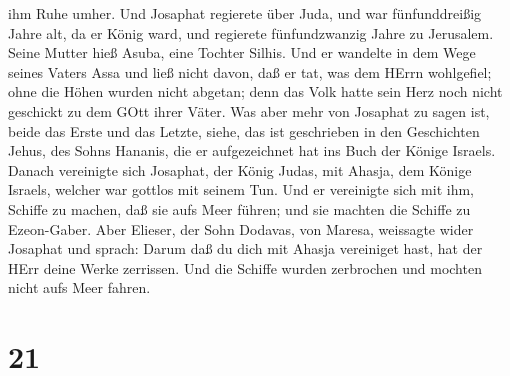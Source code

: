 ihm Ruhe umher.  Und Josaphat regierete über Juda, und war
fünfunddreißig Jahre alt, da er König ward, und regierete fünfundzwanzig
Jahre zu Jerusalem. Seine Mutter hieß Asuba, eine Tochter Silhis.
 Und er wandelte in dem Wege seines Vaters Assa und ließ
nicht davon, daß er tat, was dem HErrn wohlgefiel;  ohne
die Höhen wurden nicht abgetan; denn das Volk hatte sein Herz noch nicht
geschickt zu dem GOtt ihrer Väter.  Was aber mehr von
Josaphat zu sagen ist, beide das Erste und das Letzte, siehe, das ist
geschrieben in den Geschichten Jehus, des Sohns Hananis, die er
aufgezeichnet hat ins Buch der Könige Israels.  Danach
vereinigte sich Josaphat, der König Judas, mit Ahasja, dem Könige
Israels, welcher war gottlos mit seinem Tun.  Und er
vereinigte sich mit ihm, Schiffe zu machen, daß sie aufs Meer führen;
und sie machten die Schiffe zu Ezeon-Gaber.  Aber Elieser,
der Sohn Dodavas, von Maresa, weissagte wider Josaphat und sprach: Darum
daß du dich mit Ahasja vereiniget hast, hat der HErr deine Werke
zerrissen. Und die Schiffe wurden zerbrochen und mochten nicht aufs Meer
fahren.

\hypertarget{section-20}{%
\section{21}\label{section-20}}

